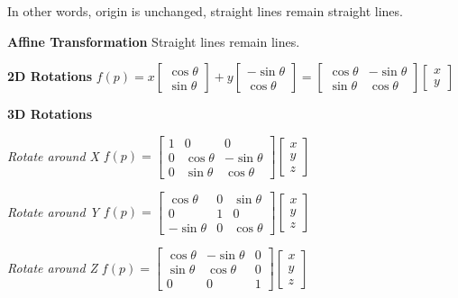 \documentclass[letterpaper, 8pt]{extarticle}
\begin{document}
\begin{multicols*}{4}
In other words, origin is unchanged, straight lines remain straight lines.

\textbf{Affine Transformation}
Straight lines remain lines.

\textbf{2D Rotations}
\(
f(p)
= x \begin{bmatrix}
    \cos \theta \\ \sin \theta
\end{bmatrix}
+ y \begin{bmatrix}
    -\sin \theta \\ \cos \theta
\end{bmatrix}
= \begin{bmatrix}
    \cos \theta & - \sin \theta \\
    \sin \theta &   \cos \theta
\end{bmatrix}
\begin{bmatrix}
    x \\ y
\end{bmatrix}
\)

\textbf{3D Rotations}

\textit{Rotate around X}
\(
f(p) = \begin{bmatrix}
    1 & 0 & 0 \\
    0 & \cos \theta & -\sin \theta \\
    0 & \sin \theta & \cos \theta
\end{bmatrix}
\begin{bmatrix}
    x \\ y \\ z
\end{bmatrix}
\)

\textit{Rotate around Y}
\(
f(p) = \begin{bmatrix}
    \cos \theta & 0 & \sin \theta \\
    0 & 1 & 0 \\
    -\sin \theta & 0 & \cos \theta
\end{bmatrix}
\begin{bmatrix}
    x \\ y \\ z
\end{bmatrix}
\)

\textit{Rotate around Z}
\(
f(p) = \begin{bmatrix}
    \cos \theta & -\sin \theta & 0 \\
    \sin \theta & \cos \theta & 0 \\
    0 & 0 & 1
\end{bmatrix}
\begin{bmatrix}
    x \\ y \\ z
\end{bmatrix}
\)


\end{multicols*}
\end{document}
